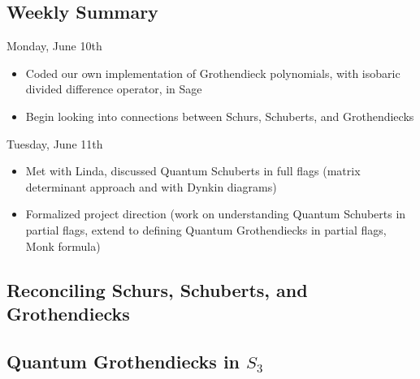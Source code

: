 \subsection{Weekly Summary}

Monday, June 10th
\begin{itemize}
    \item Coded our own implementation of Grothendieck polynomials, with isobaric divided difference operator, in Sage
    \item Begin looking into connections between Schurs, Schuberts, and Grothendiecks
\end{itemize}

Tuesday, June 11th
\begin{itemize}
    \item Met with Linda, discussed Quantum Schuberts in full flags (matrix determinant approach and with Dynkin diagrams)
    \item Formalized project direction (work on understanding Quantum Schuberts in partial flags, extend to defining Quantum Grothendiecks in partial flags, Monk formula)
\end{itemize}

\subsection{Reconciling Schurs, Schuberts, and Grothendiecks}



\subsection{Quantum Grothendiecks in $S_3$}